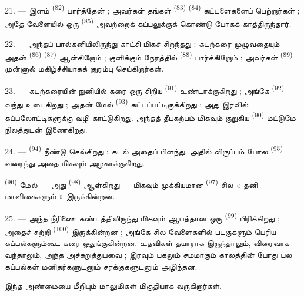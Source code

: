 21. --- இளம்  \textsuperscript{(82)}
பார்த்தேன் ; அவர்கள் தங்கள் 
\textsuperscript{(83)} 
\textsuperscript{(84)} கட்டளைகளைப் பெற்றார்கள் ; அதே வேளையில் ஒரு
 \textsuperscript{(85)} அவற்றைக்
கப்பலுக்குக் கொண்டு போகக் காத்திருந்தார்.

22. --- அந்தப் பால்கனியிலிருந்து காட்சி மிகச் சிறந்தது : கடற்கரை
முழுவதையும் அதன்  \textsuperscript{(86)}
 \textsuperscript{(87)} ஆள்கிறோம் ;
குளிக்கும் நேரத்தில்  \textsuperscript{(88)}
பார்க்கிறோம் ; அவர்கள்  \textsuperscript{(89)}
முன்னால் மகிழ்ச்சியாகக் குறும்பு செய்கிறார்கள்.

23. --- கடற்கரையின் நுனியில் கரை ஒரு சிறிய 
 \textsuperscript{(91)} உண்டாக்குகிறது ; அங்கே
 \textsuperscript{(92)} வந்து உடைகிறது ; அதன் மேல்
 \textsuperscript{(93)}
கட்டப்பட்டிருக்கிறது ; அது இரவில் கப்பலோட்டிகளுக்கு வழி காட்டுகிறது.
அந்தத் தீபகற்பம் மிகவும் குறுகிய 
\textsuperscript{(90)} மட்டுமே நிலத்துடன் இணைகிறது.

\VUsaut{3.0mm}
\VUsaut{3.0mm}

24. ---  \textsuperscript{(94)} நீண்டு
செல்கிறது ; கடல் அதைப் பிளந்து, அதில் விருப்பம் போல
 \textsuperscript{(95)} 
வரைந்து அதை மிகவும் அழகாக்குகிறது.

 \textsuperscript{(96)} மேல் — அது
 \textsuperscript{(98)} ஆள்கிறது — மிகவும்
முக்கியமான  \textsuperscript{(97)} சில
« தனி மாளிகைகளும் » இருக்கின்றன.

25. --- அந்த நீரிணை கண்டத்திலிருந்து மிகவும் ஆபத்தான ஒரு
 \textsuperscript{(99)} பிரிக்கிறது ; அதைச் சுற்றி
 \textsuperscript{(100)}  இருக்கின்றன ; அங்கே சில வேளைகளில் படகுகளும் பெரிய
கப்பல்களும்கூட கரை ஒதுங்குகின்றன. உதவிகள் தயாராக இருந்தாலும்,
 விரைவாக வந்தாலும், அந்த  அச்சுறுத்துபவை ; இரவும் பகலும் சமமாகும் காலத்தின்
 போது பல கப்பல்கள் மனிதர்களுடனும்
சரக்குகளுடனும் அழிந்தன.

இந்த அண்மையை மீறியும்  மாலுமிகள் மிகுதியாக
வருகிறார்கள்.

\VUsaut{6.0mm}
\VUfilet{22mm}

